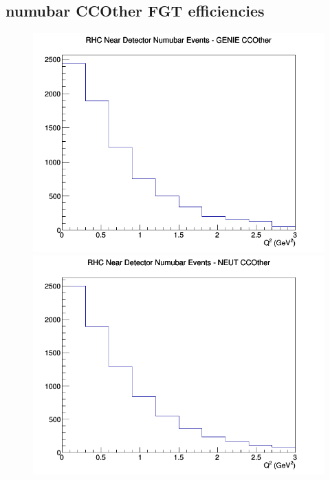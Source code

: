 \subsection{numubar CCOther FGT efficiencies}
\begin{figure}[h]
\includegraphics[width=\linewidth]{eff_Q2/FGT/CCOther_RHC_ND_numubar_Q2_GENIE.png}
\endminipage
{}
\includegraphics[width=\linewidth]{eff_Q2/FGT/CCOther_RHC_ND_numubar_Q2_NEUT.png}
\endminipage
{}

\end{figure}
